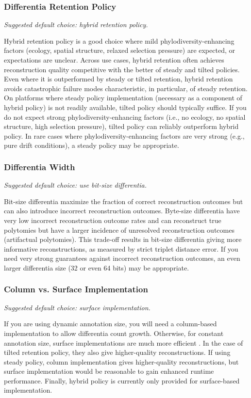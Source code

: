 \subsubsection{Differentia Retention Policy}
\textit{Suggested default choice: hybrid retention policy.}

Hybrid retention policy is a good choice where mild phylodiversity-enhancing factors (ecology, spatial structure, relaxed selection pressure) are expected, or expectations are unclear.
Across use cases, hybrid retention often achieves reconstruction quality competitive with the better of steady and tilted policies.
Even where it is outperformed by steady or tilted retention, hybrid retention avoids catastrophic failure modes characteristic, in particular, of steady retention.
On platforms where steady policy implementation (necessary as a component of hybrid policy) is not readily available, tilted policy should typically suffice.
If you do not expect strong phylodiversity-enhancing factors (i.e., no ecology, no spatial structure, high selection pressure), tilted policy can reliably outperform hybrid policy.
In rare cases where phylodiversity-enhancing factors are very strong (e.g., pure drift conditions), a steady policy may be appropriate.

\subsubsection{Differentia Width}
\textit{Suggested default choice: use bit-size differentia.}

Bit-size differentia maximize the fraction of correct reconstruction outcomes but can also introduce incorrect reconstruction outcomes.
Byte-size differentia have very low incorrect reconstruction outcome rates and can reconstruct true polytomies but have a larger incidence of unresolved reconstruction outcomes (artifactual polytomies).
This trade-off results in bit-size differentia giving more informative reconstructions, as measured by strict triplet distance error.
If you need very strong guarantees against incorrect reconstruction outcomes, an even larger differentia size (32 or even 64 bits) may be appropriate.

\subsubsection{Column vs. Surface Implementation}
\textit{Suggested default choice: surface implementation.}

If you are using dynamic annotation size, you will need a column-based implementation to allow differentia count growth.
Otherwise, for constant annotation size, surface implementations are much more efficient \citep{moreno2024trackable}.
In the case of tilted retention policy, they also give higher-quality reconstructions.
If using steady policy, column implementation gives higher-quality reconstructions, but surface implementation would be reasonable to gain enhanced runtime performance.
Finally, hybrid policy is currently only provided for surface-based implementation.

